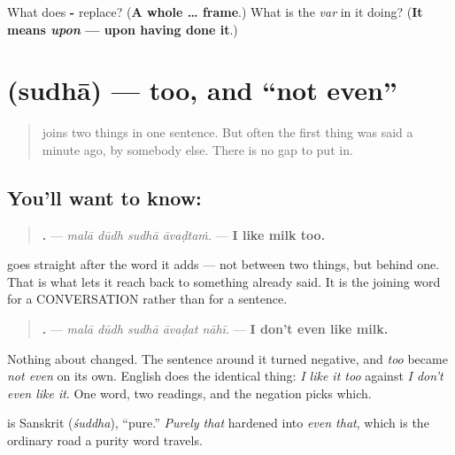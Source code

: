 \begin{tcolorbox}[breakable,colback=teal!4,colframe=teal!35!black,title={Before you move on}]
What does \textbf{-} replace? (\textbf{A whole  …  frame}.) What is the \emph{var} in it doing? (\textbf{It means \emph{upon} — upon having done it}.)
\end{tcolorbox}
\section[\texorpdfstring{\mr{सुद्धा} (sudhā)}{सुद्धा (sudhā)}]{ (sudhā) — too, and \textquotedblleft{}not even\textquotedblright{}}

\label{lesson:MR-C36-sudhaa}



\begin{quote}
\textbf{} joins two things in one sentence. But often the first thing was said a minute ago, by somebody else. There is no gap to put \textbf{} in.
\end{quote}

\subsection*{You'll want to know: }
\begin{quote}
\textbf{   .} — \emph{malā dūdh sudhā āvaḍtaṁ.} — \textbf{I like milk too.}
\end{quote}

\textbf{} goes straight after the word it adds — not between two things, but behind one. That is what lets it reach back to something already said. It is the joining word for a CONVERSATION rather than for a sentence.

\begin{grammarlens}[title={Grammar Lens: the same word in front of a denial}]
\begin{quote}
\textbf{    .} — \emph{malā dūdh sudhā āvaḍat nāhī.} — \textbf{I don't even like milk.}
\end{quote}

Nothing about \textbf{} changed. The sentence around it turned negative, and \emph{too} became \emph{not even} on its own. English does the identical thing: \emph{I like it too} against \emph{I don't even like it}. One word, two readings, and the negation picks which.

\textbf{} is Sanskrit \textbf{} (\emph{śuddha}), \textquotedblleft{}pure.\textquotedblright{} \emph{Purely that} hardened into \emph{even that}, which is the ordinary road a purity word travels.
\end{grammarlens}

